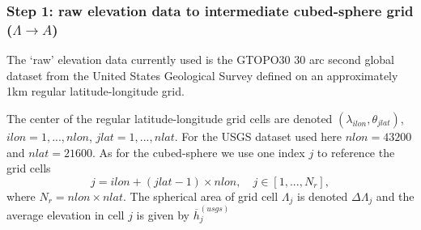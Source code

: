 \documentclass[gmd]{copernicus}
\begin{document}
\subsubsection{Step 1: raw elevation data to intermediate cubed-sphere grid ($\Lambda \rightarrow A$)}\label{sec:step1}
The `raw' elevation data currently used is the GTOPO30 30 arc second global dataset from the United States Geological Survey \citep[USGS][]{USGS} defined on an approximately 1km regular latitude-longitude grid.

The center of the regular latitude-longitude grid cells are denoted $(\lambda_{ilon},\theta_{jlat})$, $ilon=1,..., nlon$, $jlat=1, ..., nlat$. For the USGS dataset used here $nlon=43200$ and $nlat=21600$. As for the cubed-sphere we use one index $j$ to reference the grid cells
\begin{equation}
j=ilon+(jlat-1)\times nlon, \quad j\in [1, ..., N_r],
\end{equation} 
where $N_r=nlon\times nlat$. The spherical area of grid cell $\Lambda_j$ is denoted $\Delta \Lambda_j$ and the average elevation in cell $j$ is given by $\overline{h}^{(usgs)}_j$ 
\end{document}
